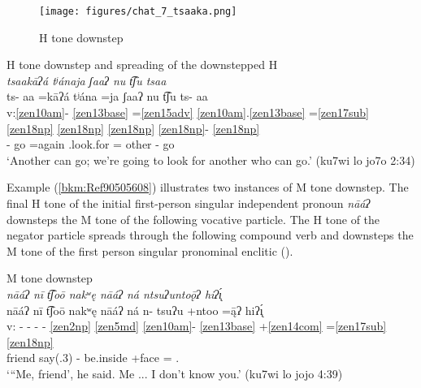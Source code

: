 \documentclass[output=paper]{langscibook}
\begin{document}
\begin{figure}[p]
    \centering
    \texttt{[image: figures/chat\_7\_tsaaka.png]}
    \caption{H tone downstep}
    \label{fig:chat:key:7}
\end{figure}


\ea\label{bkm:Ref90286148}H tone downstep and spreading of the downstepped H\\
\textit{tsaakāʔá tʲánaja ʃaaʔ nu t͡ʃu tsaa} \\
\glll ts- aa =kāʔá tʲána =ja ʃaaʔ nu t͡ʃu ts- aa\\
v:\ref{zen10am}{}- \ref{zen13base} =\ref{zen15adv} \ref{zen10am}.\ref{zen13base} =\ref{zen17sub} \ref{zen18np} \ref{zen18np} \ref{zen18np} \ref{zen18np}{}- \ref{zen18np} \\
\Pot{}{}- go =again \Pot{}.look.for =\First\Excl{} other \Sub{} \Hum{} \Pot{}{}- go\\
\glt `Another can go; we're going to look for another who can go.' (ku7wi lo jo7o 2:34)
\z



Example (\ref{bkm:Ref90505608}) illustrates two instances of M tone downstep. The final H tone of the initial first-person singular independent pronoun \textit{nāáʔ} downsteps the M tone of the following vocative particle. The H tone of the negator particle spreads through the following compound verb and downsteps the M tone of the first person singular pronominal enclitic  ().


\ea\label{bkm:Ref90505608} M tone downstep \\
\textit{nāáʔ nī t͡ʃoō nakʷę nāáʔ ná ntsuʔuntoǭʔ hiʔ\'{\k{ı}}} \\
\glll {} nāáʔ nī t͡ʃoō nakʷę nāáʔ ná n- tsuʔu +ntoo =ą̄ʔ hiʔ\'{\k{ı}}\\
v: - - - - \ref{zen2np} \ref{zen5md} \ref{zen10am}{}- \ref{zen13base} +\ref{zen14com} =\ref{zen17sub} \ref{zen18np} \\
{} \First\Sg{} \Voc{} friend say(.3) \First\Sg{} \Neg{} \Stat{}- be.inside +face =\First\Sg{} \Obj{}.\Second\Sg{}\\
\glt `“Me, friend', he said. Me ... I don't know you.'  (ku7wi lo jojo 4:39)
\z
\end{document}
